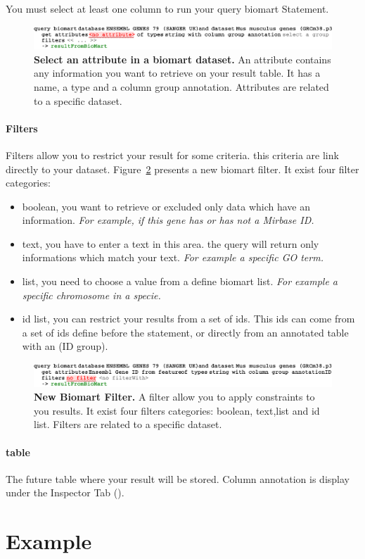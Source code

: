 \begin{remark}
You must select at least one column to run your query biomart Statement.
\end{remark}

 \begin{figure}[h!tbp]
  \centering
  \includegraphics[width=\figWidthWide]{figures/BiomartAttribute.pdf}
\caption[Select an attribute in a biomart dataset.]{\textbf{Select an attribute in a biomart dataset.} An attribute contains any information you want to retrieve on your result table. It has a name, a type and a column group annotation. Attributes are related to a specific dataset.}
\label{fig:attributeBiomart}
\end{figure}
\paragraph{Filters}
Filters allow you to restrict your result for some criteria. this criteria are link directly to your dataset. Figure~\ref{fig:BiomartFilter} presents a new biomart filter. It exist four filter categories: 
\begin{itemize}
\item boolean, you want to retrieve or excluded only data which have an information. \textit{For example, if this gene has or has not a Mirbase ID.}
\item text, you have to enter a text in this area. the query will return only informations which match your text. \textit{For example  a specific GO term.}
\item list,  you need to choose a value from a define biomart list. \textit{For example a specific chromosome in a specie.}
\item id list, you can restrict your results from a set of ids. This ids can come from a set of ids define before the statement, or directly from an annotated table with an (ID group).  
\end{itemize}

 \begin{figure}[h!tbp]
  \centering
  \includegraphics[width=\figWidthWide]{figures/BiomartFilter.pdf}
\caption[New Biomart Filter]{\textbf{New Biomart Filter.} A filter allow you to apply constraints to you results. It exist four filters categories: boolean, text,list and id list. Filters are related to a specific dataset.}
\label{fig:BiomartFilter}
\end{figure}

\paragraph{table}
The future table where your result will be stored. Column annotation is display under the Inspector Tab (\inspectorTabIcon).
\section{Example}
